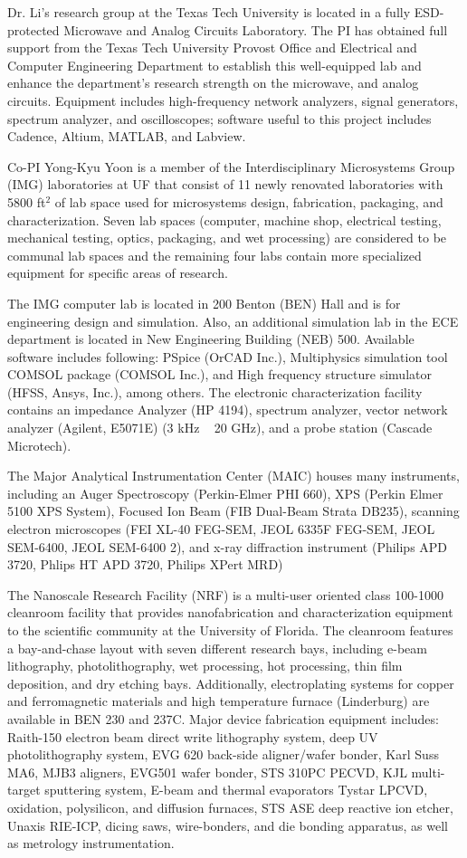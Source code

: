 Dr. Li's research group at the Texas Tech University is located in a fully ESD-protected Microwave and Analog Circuits Laboratory. The PI has obtained full support from the Texas Tech University Provost Office and Electrical and Computer Engineering Department to establish this well-equipped lab and enhance the department’s research strength on the microwave, and analog circuits. Equipment includes high-frequency network analyzers, signal generators, spectrum analyzer, and oscilloscopes; software useful to this project includes Cadence, Altium, MATLAB, and Labview.

Co-PI Yong-Kyu Yoon is a member of the Interdisciplinary Microsystems Group (IMG) laboratories at UF that consist of 11 newly renovated laboratories with 5800 ft$^2$ of lab space used for microsystems design, fabrication, packaging, and characterization.  Seven lab spaces (computer, machine shop, electrical testing, mechanical testing, optics, packaging, and wet processing) are considered to be communal lab spaces and the remaining four labs contain more specialized equipment for specific areas of research. 

The IMG computer lab is located in 200 Benton (BEN) Hall and is for engineering design and simulation. Also, an additional simulation lab in the ECE department is located in New Engineering Building (NEB) 500. Available software includes following: PSpice (OrCAD Inc.), Multiphysics simulation tool COMSOL package (COMSOL Inc.), and  High frequency structure simulator (HFSS, Ansys, Inc.), among others. The electronic characterization facility contains an impedance Analyzer (HP 4194),  spectrum analyzer,  vector network analyzer (Agilent, E5071E) (3 kHz ~ 20 GHz), and a probe station (Cascade Microtech).

The Major Analytical Instrumentation Center (MAIC) houses many instruments, including an Auger Spectroscopy (Perkin-Elmer PHI 660), XPS (Perkin Elmer 5100 XPS System), Focused Ion Beam (FIB Dual-Beam Strata DB235), scanning electron microscopes (FEI XL-40 FEG-SEM, JEOL 6335F FEG-SEM, JEOL SEM-6400, JEOL SEM-6400 2), and x-ray diffraction instrument (Philips APD 3720, Phlips HT APD 3720, Philips XPert MRD)

The Nanoscale Research Facility (NRF) is a multi-user oriented class 100-1000 cleanroom facility that provides nanofabrication and characterization equipment to the scientific community at the University of Florida. The cleanroom features a bay-and-chase layout with seven different research bays, including e-beam lithography, photolithography, wet processing, hot processing, thin film deposition, and dry etching bays.  Additionally, electroplating systems for copper and ferromagnetic materials and high temperature furnace (Linderburg) are available in BEN 230 and 237C. Major device fabrication equipment includes: Raith-150 electron beam direct write lithography system, deep UV photolithography system, EVG 620 back-side aligner/wafer bonder, Karl Suss MA6, MJB3 aligners, EVG501 wafer bonder, STS 310PC PECVD, KJL multi-target sputtering system, E-beam and thermal evaporators Tystar LPCVD, oxidation, polysilicon, and diffusion furnaces, STS ASE deep reactive ion etcher, Unaxis RIE-ICP, dicing saws, wire-bonders, and die bonding apparatus, as well as metrology instrumentation.

